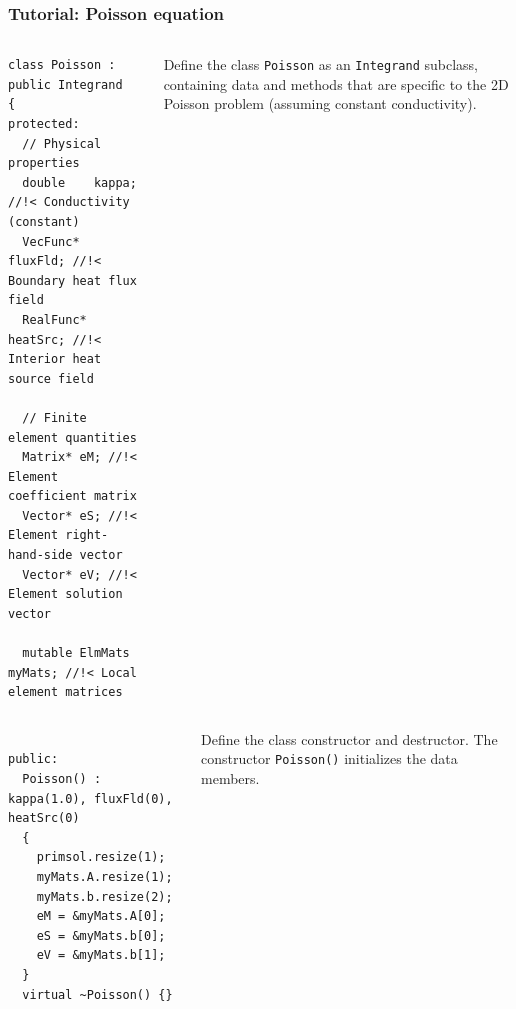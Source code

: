 \documentclass{beamer}
\begin{document}
\begin{frame}[fragile] %
 \frametitle{Tutorial: Poisson equation}

 \begin{columns}[c]
  \tiny\begin{verbatim}
class Poisson : public Integrand
{
protected:
  // Physical properties
  double    kappa;   //!< Conductivity (constant)
  VecFunc*  fluxFld; //!< Boundary heat flux field
  RealFunc* heatSrc; //!< Interior heat source field

  // Finite element quantities
  Matrix* eM; //!< Element coefficient matrix
  Vector* eS; //!< Element right-hand-side vector
  Vector* eV; //!< Element solution vector

  mutable ElmMats myMats; //!< Local element matrices
  \end{verbatim}
   \small
  Define the class {\tt Poisson} as an {\tt Integrand} subclass,
  containing data and methods that are specific to the 2D Poisson problem
  (assuming constant conductivity).
 \end{columns}
 \pause
 \begin{columns}[c]
  \tiny\begin{verbatim}

public:
  Poisson() : kappa(1.0), fluxFld(0), heatSrc(0)
  {
    primsol.resize(1);
    myMats.A.resize(1);
    myMats.b.resize(2);
    eM = &myMats.A[0];
    eS = &myMats.b[0];
    eV = &myMats.b[1];
  }
  virtual ~Poisson() {}
  \end{verbatim}
  \small
  Define the class constructor and destructor.
  The constructor {\tt Poisson()} initializes the data members.
 \end{columns}

\end{frame}
\end{document}
